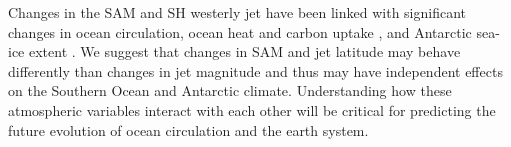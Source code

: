 Changes in the SAM and SH westerly jet have been linked with significant changes
in ocean circulation, ocean heat and carbon uptake \citep{Mignone2006b}, and
Antarctic sea-ice extent \citep{Fan2014b}. We suggest that changes
in SAM and jet latitude may behave differently than changes in jet magnitude and
thus may have independent effects on the Southern Ocean and Antarctic climate.
Understanding how these atmospheric variables interact with each other will be
critical for predicting the future evolution of ocean circulation and the earth
system.


%
